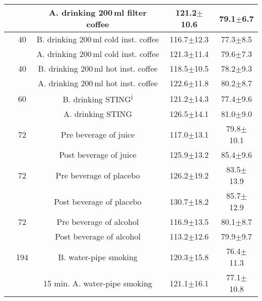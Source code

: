 \documentclass[journal,article,moreauthors]{Definitions/mdpi}
\begin{document}
\begin{table}[tb]
\begin{center}
{\begin{tabularx}{\textwidth}{rcccc}
& & A. drinking 200\,ml filter coffee & 121.2$\pm$10.6 & 79.1$\pm$6.7
\\\hline
\citep{Papakonstantinou2016-mj} & 40 & B. drinking 200\,ml cold inst. coffee & 116.7$\pm$12.3 & 77.3$\pm$8.5 \\ 
& & A. drinking 200\,ml cold inst. coffee & 121.3$\pm$11.4 & 79.6$\pm$7.3
\\\hline
\citep{Papakonstantinou2016-mj} & 40 & B. drinking 200\,ml hot inst. coffee & 118.5$\pm$10.5 & 78.2$\pm$9.3 \\ 
& & A. drinking 200\,ml hot inst. coffee & 122.6$\pm$11.8 & 80.2$\pm$8.7
\\\hline
\citep{luqmanexperimental} & 60 & B. drinking STING\textsuperscript{i} & 121.2$\pm$14.3 & 77.4$\pm$9.6 \\ 
& & A. drinking STING & 126.5$\pm$14.1 & 81.0$\pm$9.0
\\\hline
\citep{Buckman2015-ew} & 72 & Pre beverage of juice & 117.0$\pm$13.1 & 79.8$\pm$10.1 \\ 
& & Post beverage of juice & 125.9$\pm$13.2 & 85.4$\pm$9.6
\\\hline
\citep{Buckman2015-ew} & 72 & Pre beverage of placebo & 126.2$\pm$19.2 & 83.5$\pm$13.9 \\ 
& & Post beverage of placebo & 130.7$\pm$18.2 & 85.7$\pm$12.9
\\\hline
\citep{Buckman2015-ew} & 72 & Pre beverage of alcohol & 116.9$\pm$13.5 & 80.1$\pm$8.7 \\ 
& & Post beverage of alcohol & 113.2$\pm$12.6 & 79.9$\pm$9.7
\\\hline
\citep{Azar2016-eg} & 194 & B. water-pipe smoking & 120.3$\pm$15.8 & 76.4$\pm$11.3 \\ 
& & 15 min. A. water-pipe smoking & 121.1$\pm$16.1 & 77.1$\pm$10.8
\\
\bottomrule
\end{tabularx}}
\end{center}
\end{table}
\end{document}
